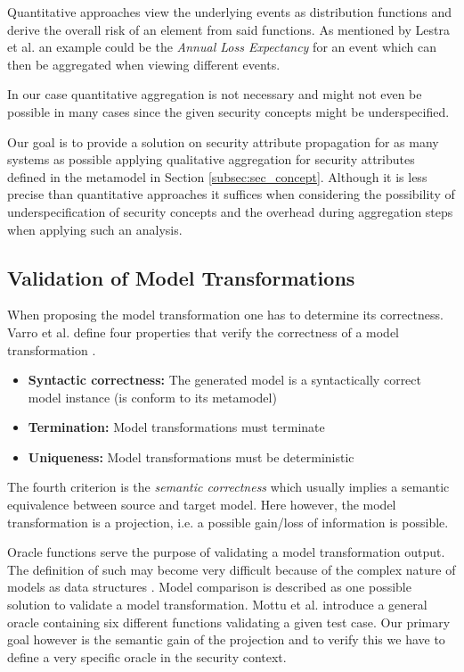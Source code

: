 Quantitative approaches view the underlying events as distribution functions and derive the overall risk of an element from said functions. As mentioned by Lestra et al. an example could be the \textit{Annual Loss Expectancy} for an event which can then be aggregated when viewing different events.

In our case quantitative aggregation is not necessary and might not even be possible in many cases since the given security concepts might be underspecified. 

Our goal is to provide a solution on security attribute propagation for as many systems as possible applying qualitative aggregation for security attributes defined in the metamodel in Section \ref{subsec:sec_concept}. Although it is less precise than quantitative approaches \cite{Lenstra2004} it suffices when considering the possibility of underspecification of security concepts and the overhead during aggregation steps when applying such an analysis.

\subsection{Validation of Model Transformations}

When proposing the model transformation one has to determine its correctness. Varro et al. define four properties that verify the correctness of a model transformation \cite{vacca2012computer}.

\begin{itemize}
\item[]\textbf{Syntactic correctness:} The generated model is a syntactically correct model instance (is conform to its metamodel)
\item[]\textbf{Termination:} Model transformations must terminate
\item[]\textbf{Uniqueness:} Model transformations must be deterministic 
\end{itemize}

The fourth criterion is the \textit{semantic correctness} which usually implies a semantic equivalence between source and target model. Here however, the model transformation is a projection, i.e. a possible gain/loss of information is possible.  

Oracle functions serve the purpose of validating a model transformation output. The definition of such may become very difficult because of the complex nature of models as data structures \cite{mottu}. Model comparison is described as one possible solution to validate a model transformation. Mottu et al. introduce a general oracle containing six different functions validating a given test case. Our primary goal however is the semantic gain of the projection and to verify this we have to define a very specific oracle in the security context. 

